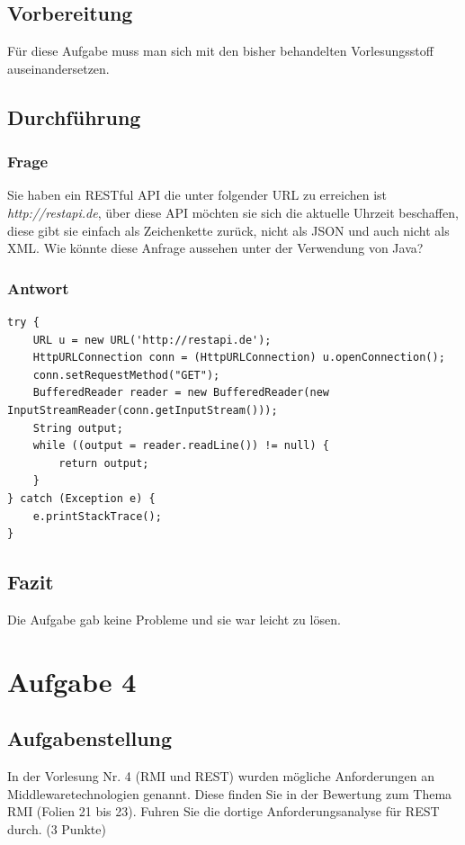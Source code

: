 \subsection{Vorbereitung}
Für diese Aufgabe muss man sich mit den bisher behandelten Vorlesungsstoff auseinandersetzen. 

\subsection{Durchführung}

\subsubsection{Frage}
Sie haben ein RESTful API die unter folgender URL zu erreichen ist \textit{http://restapi.de}, über diese API möchten sie sich die aktuelle Uhrzeit beschaffen, diese gibt sie einfach als Zeichenkette zurück, nicht als JSON und auch nicht als XML. Wie könnte diese Anfrage aussehen unter der Verwendung von Java?

\subsubsection{Antwort}
\begin{lstlisting}
try {
	URL u = new URL('http://restapi.de');
	HttpURLConnection conn = (HttpURLConnection) u.openConnection();
	conn.setRequestMethod("GET");
	BufferedReader reader = new BufferedReader(new InputStreamReader(conn.getInputStream()));
	String output;
	while ((output = reader.readLine()) != null) {
		return output;
	}
} catch (Exception e) {
	e.printStackTrace();
}
\end{lstlisting}

\subsection{Fazit}
Die Aufgabe gab keine Probleme und sie war leicht zu lösen.

\section{Aufgabe 4}

\subsection{Aufgabenstellung}
In der Vorlesung Nr. 4 (RMI und REST) wurden mögliche Anforderungen an Middlewaretechnologien
genannt. Diese finden Sie in der Bewertung zum Thema RMI (Folien 21
bis 23). Fuhren Sie die dortige Anforderungsanalyse für REST durch. (3 Punkte) 

